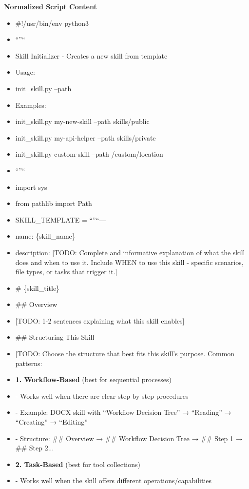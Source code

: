 \documentclass[11pt]{article}
\begin{document}
\textbf{Normalized Script Content}
\begin{itemize}[leftmargin=*,itemsep=2pt,topsep=2pt]
\item {} \#!/usr/bin/env python3
\item {} ``''``
\item {} Skill Initializer - Creates a new skill from template
\item {} Usage:
\item {} init\_\allowbreak{}skill.py --path
\item {} Examples:
\item {} init\_\allowbreak{}skill.py my-new-skill --path skills/public
\item {} init\_\allowbreak{}skill.py my-api-helper --path skills/private
\item {} init\_\allowbreak{}skill.py custom-skill --path /custom/location
\item {} ``''``
\item {} import sys
\item {} from pathlib import Path
\item {} SKILL\_\allowbreak{}TEMPLATE = ``''``---
\item {} name: \{skill\_\allowbreak{}name\}
\item {} description: [TODO: Complete and informative explanation of what the skill does and when to use it. Include WHEN to use this skill - specific scenarios, file types, or tasks that trigger it.]
\item {} \# \{skill\_\allowbreak{}title\}
\item {} \#\# Overview
\item {} [TODO: 1-2 sentences explaining what this skill enables]
\item {} \#\# Structuring This Skill
\item {} [TODO: Choose the structure that best fits this skill's purpose. Common patterns:
\item {} \textbf{1. Workflow-Based} (best for sequential processes)
\item {} - Works well when there are clear step-by-step procedures
\item {} - Example: DOCX skill with ``Workflow Decision Tree'' → ``Reading'' → ``Creating'' → ``Editing''
\item {} - Structure: \#\# Overview → \#\# Workflow Decision Tree → \#\# Step 1 → \#\# Step 2...
\item {} \textbf{2. Task-Based} (best for tool collections)
\item {} - Works well when the skill offers different operations/capabilities

\end{itemize}
\end{document}

